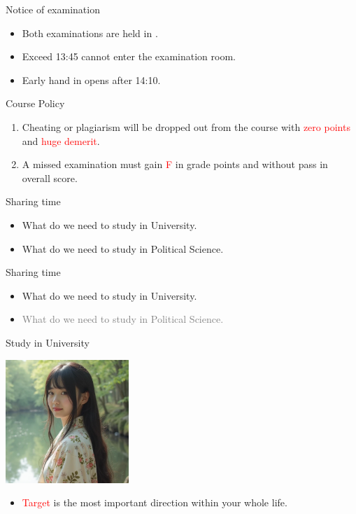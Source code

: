 \documentclass{beamer}
\begin{document}
\begin{frame}{Notice of examination}
\begin{itemize}
\item Both examinations are held in .
\item Exceed 13:45 cannot enter the examination room.
\item Early hand in opens after 14:10.
\end{itemize}
\end{frame}
\begin{frame}{Course Policy}
\begin{enumerate}
\item Cheating or plagiarism will be dropped out from the course with \textcolor{red}{zero points} and \textcolor{red}{huge demerit}. \\
\item A missed examination must gain \textcolor{red}{F} in grade points and without pass in overall score. 
\end{enumerate}
\end{frame}
\begin{frame}{Sharing time}
\begin{itemize}
\item What do we need to study in University.
\item What do we need to study in Political Science.
\end{itemize}
\end{frame}
\begin{frame}{Sharing time}
\begin{itemize}
\item What do we need to study in University.
\item \textcolor{gray}{What do we need to study in Political Science.}
\end{itemize}
\end{frame}
\begin{frame}{Study in University}
\begin{center}
\includegraphics[width=0.35\textwidth]{target.png}
\end{center}
\begin{itemize}
\item \textcolor{red}{Target} is the most important direction within your whole life.
\end{itemize}
\end{frame}
\end{document}
